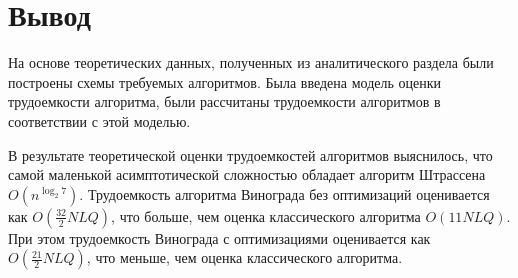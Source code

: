 \section*{Вывод}
На основе теоретических данных, полученных из аналитического раздела были построены схемы требуемых алгоритмов. 
Была введена модель оценки трудоемкости алгоритма, были рассчитаны трудоемкости алгоритмов в соответствии с этой моделью.

В результате теоретической оценки трудоемкостей алгоритмов выяснилось, что самой маленькой асимптотической сложностью обладает алгоритм Штрассена $O(n^{\log_2{7}})$. 
Трудоемкость алгоритма Винограда без оптимизаций оценивается как $O(\frac{32}{2}NLQ)$, что больше, чем оценка классического алгоритма $O(11NLQ)$.
При этом трудоемкость Винограда с оптимизациями оценивается как $O(\frac{21}{2}NLQ)$, что меньше, чем оценка классического алгоритма.